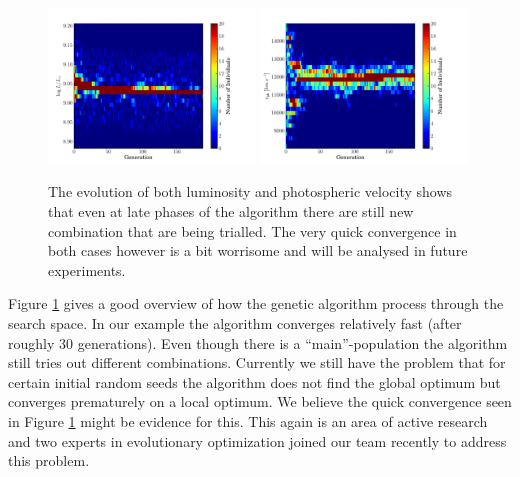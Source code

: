 \begin{figure}[htbp] %
   \centering
   \includegraphics[width=0.49\textwidth]{chapter_dalek/plots/plot_02bo_lum_evol.pdf} 
   \includegraphics[width=0.49\textwidth]{chapter_dalek/plots/plot_02bo_vph_evol.pdf} 
   \caption{The evolution of both luminosity and photospheric velocity shows that even at late phases of the algorithm there are still new combination that are being trialled. The very quick convergence in both cases however is a bit worrisome and will be analysed in future experiments.}
   \label{fig:lumvph_evolution}
\end{figure}


Figure \ref{fig:lumvph_evolution} gives a good overview of how the genetic algorithm process through the search space. In our example the algorithm converges relatively fast (after roughly 30 generations). Even though there is a ``main''-population the algorithm still tries out different combinations. Currently we still have the problem that for certain initial random seeds the algorithm does not find the global optimum but converges prematurely on a local optimum. We believe the quick convergence seen in Figure \ref{fig:lumvph_evolution} might be evidence for this. This again is an area of active research and two experts in evolutionary optimization joined our team recently to address this problem. 

